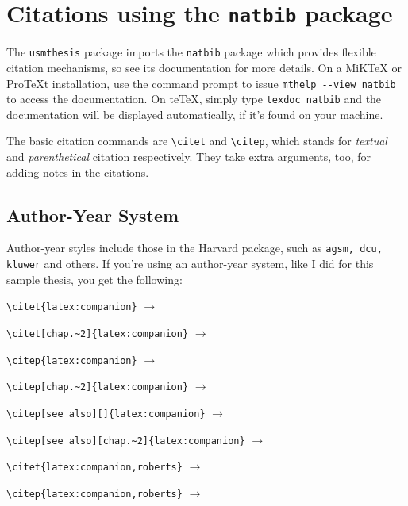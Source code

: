 \section{Citations using the \texttt{natbib} package}
The \verb|usmthesis| package imports the \verb|natbib| package which provides flexible citation mechanisms, so see its documentation for more details.  On a MiK\TeX{} or Pro\TeX{}t installation,
use the command prompt to issue \lstinline|mthelp --view natbib| to access the documentation.
On teTeX, simply type \verb|texdoc natbib| and the documentation will be displayed automatically, if it's found on your machine.

The basic citation commands are \verb|\citet| and \verb|\citep|, which stands for \emph{textual} and \emph{parenthetical} citation respectively.  They take extra arguments, too, for adding notes in the citations.  

\subsection{Author-Year System}
Author-year styles include those in the Harvard package, such as \texttt{agsm, dcu, kluwer} and others.
If you're using an author-year system, like I did for this sample thesis, you get the following:

\begin{compactitem}
\item \verb|\citet{latex:companion}| $\to$ \citet{latex:companion}
\item \verb|\citet[chap.~2]{latex:companion}| $\to$ \citet[chap.~2]{latex:companion}
\item \verb|\citep{latex:companion}| $\to$ \citep{latex:companion}
\item \verb|\citep[chap.~2]{latex:companion}| $\to$ \citep[chap.~2]{latex:companion}
\item \verb|\citep[see also][]{latex:companion}| $\to$ \citep[see also][]{latex:companion}
\item \verb|\citep[see also][chap.~2]{latex:companion}| $\to$ \citep[see also][chap.~2]{latex:companion}
\item \verb|\citet{latex:companion,roberts}| $\to$ \citet{latex:companion,roberts}
\item \verb|\citep{latex:companion,roberts}| $\to$ \citep{latex:companion,roberts}
\end{compactitem}

